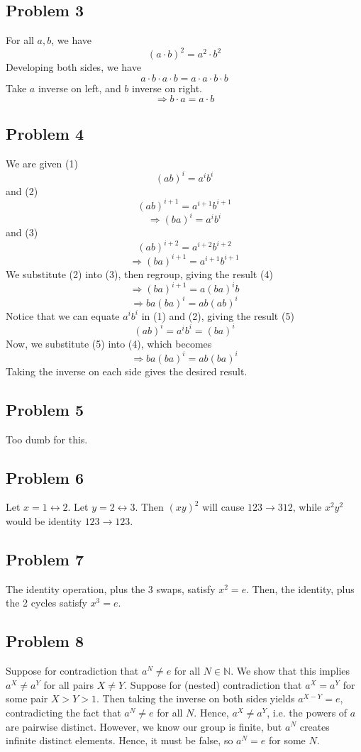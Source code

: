 \documentclass{book}
\begin{document}
\subsection*{Problem 3}
For all $a, b$, we have
$$(a \cdot b)^2 = a^2 \cdot b^2$$
Developing both sides, we have
$$a \cdot b \cdot a \cdot b = a \cdot a \cdot b \cdot b$$
Take $a$ inverse on left, and $b$ inverse on right.
$$\Rightarrow b \cdot a = a \cdot b$$

\subsection*{Problem 4}
We are given (1)
$$(ab)^i = a^i b^i$$
and (2)
$$(ab)^{i + 1} = a^{i + 1} b^{i + 1}$$
$$\Rightarrow (ba)^i = a^i b^i$$
and (3)
$$(ab)^{i + 2} = a^{i + 2} b^{i + 2}$$
$$\Rightarrow (ba)^{i + 1} = a^{i + 1} b^{i + 1}$$
We substitute (2) into (3), then regroup, giving the result (4)
$$\Rightarrow (ba)^{i + 1} = a (ba)^i b$$
$$\Rightarrow ba (ba)^i = ab (ab)^i$$
Notice that we can equate $a^i b^i$ in (1) and (2), giving the result (5)
$$(ab)^i = a^i b^i = (ba)^i$$
Now, we substitute (5) into (4), which becomes
$$\Rightarrow ba (ba)^i = ab (ba)^i$$
Taking the inverse on each side gives the desired result.

\subsection*{Problem 5}
Too dumb for this.

\subsection*{Problem 6}
Let $x = 1 \leftrightarrow 2$. Let $y = 2 \leftrightarrow 3$. Then $(xy)^2$ will cause $123 \rightarrow 312$, while $x^2 y^2$ would be identity $123 \rightarrow 123$.

\subsection*{Problem 7}
The identity operation, plus the 3 swaps, satisfy $x^2 = e$. Then, the identity, plus the 2 cycles satisfy $x^3 = e$.

\subsection*{Problem 8}
Suppose for contradiction that $a^N \neq e$ for all $N \in \mathbb{N}$. We show that this implies $a^X \neq a^Y$ for all pairs $X \neq Y$. Suppose for (nested) contradiction that $a^X = a^Y$ for some pair $X > Y > 1$. Then taking the inverse on both sides yields $a^{X - Y} = e$, contradicting the fact that $a^N \neq e$ for all $N$. Hence, $a^X \neq a^Y$, i.e. the powers of $a$ are pairwise distinct. However, we know our group is finite, but $a^N$ creates infinite distinct elements. Hence, it must be false, so $a^N = e$ for some $N$.
\end{document}
